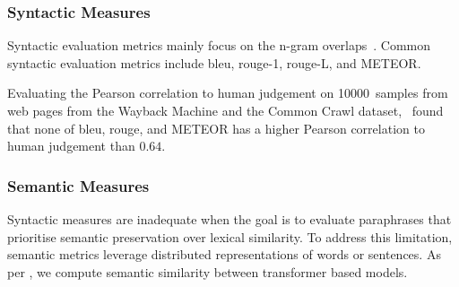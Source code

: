 

\subsubsection{Syntactic Measures}
Syntactic evaluation metrics mainly focus on the n-gram overlaps~\citep{zhou_paraphrase_2021}. 
Common syntactic evaluation metrics include \acs{bleu}, \acs{rouge}-1, \acs{rouge}-L, and METEOR.





Evaluating the Pearson correlation to human judgement on \num{10000}~samples from web pages from the Wayback Machine and the Common Crawl dataset, \citet{anantha_pearson_metrics_2021}\ found that none of \ac{bleu}, \ac{rouge}, and METEOR has a higher Pearson correlation to human judgement than $0.64$.


\subsubsection{Semantic Measures}
Syntactic measures are inadequate when the goal is to evaluate paraphrases that prioritise semantic preservation over lexical similarity. 
To address this limitation, semantic metrics leverage distributed representations of words or sentences.
As per \citet{gohsen_captions_2023}, we compute semantic similarity between transformer based models.

